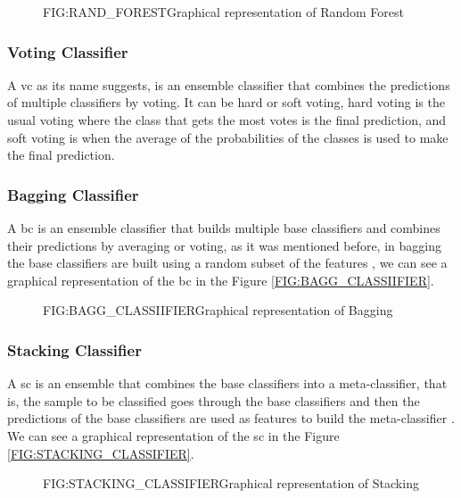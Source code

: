 \begin{figure}[Random Forest]{FIG:RAND_FOREST}{Graphical representation of Random Forest \cite{hemashreekilari_understanding_2023-2}}
\end{figure}

\subsubsection{Voting Classifier}
A \ac{vc} as its name suggests, is an ensemble classifier that combines the predictions of multiple classifiers by voting. It can be hard or soft voting, hard voting is the usual voting where the class that gets the most votes is the final prediction, and soft voting is when the average of the probabilities of the classes is used to make the final prediction.

\subsubsection{Bagging Classifier}
A \ac{bc} is an ensemble classifier that builds multiple base classifiers and combines their predictions by averaging or voting, as it was mentioned before, in bagging the base classifiers are built using a random subset of the features \cite{scikit_learn_bagging_nodate}, we can see a graphical representation of the \ac{bc} in the Figure \ref{FIG:BAGG_CLASSIIFIER}.

\begin{figure}[Bagging Classifier]{FIG:BAGG_CLASSIIFIER}{Graphical representation of Bagging \cite{hemashreekilari_understanding_2023}}
\end{figure}

\subsubsection{Stacking Classifier}
A \ac{sc} is an ensemble that combines the base classifiers into a meta-classifier, that is, the sample to be classified goes through the base classifiers and then the predictions of the base classifiers are used as features to build the meta-classifier \cite{wolpert_stacked_nodate}. We can see a graphical representation of the \ac{sc} in the Figure \ref{FIG:STACKING_CLASSIFIER}.

\begin{figure}[Stacking Classifier]{FIG:STACKING_CLASSIFIER}{Graphical representation of Stacking \cite{ceballos_stacking_2019}}
\end{figure}